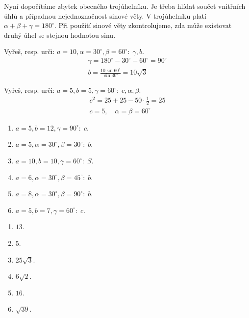 \documentclass[11pt,a4paper]{article}
\begin{document}
Nyní dopočítáme zbytek obecného trojúhelníku. Je třeba hlídat součet vnitřních úhlů a případnou nejednoznačnost sinové věty.
V trojúhelníku platí $\alpha+\beta+\gamma=180^\circ$. Při použití sinové věty zkontrolujeme, zda může existovat druhý úhel se stejnou hodnotou sinu.
\begin{prikladReseniBox}[title={Příklad 1}]
Vyřeš, resp. urči: $a=10,\alpha=30^\circ,\beta=60^\circ:\;\gamma,b$.
\tcblower
\[\begin{aligned}\gamma=180^\circ-30^\circ-60^\circ=90^\circ \\ b=\frac{10\sin60^\circ}{\sin30^\circ}=10\sqrt3\end{aligned}\]
\end{prikladReseniBox}
\begin{prikladReseniBox}[title={Příklad 2}]
Vyřeš, resp. urči: $a=5,b=5,\gamma=60^\circ:\;c,\alpha,\beta$.
\tcblower
\[\begin{aligned}c^2=25+25-50\cdot\frac{1}{2}=25 \\ c=5,\quad\alpha=\beta=60^\circ\end{aligned}\]
\end{prikladReseniBox}
\begin{zadaniReseniBox}[title={Samostatná práce 1}]
\begin{enumerate}[label=\alph*)]
\item $a=5,b=12,\gamma=90^\circ:\;c$.
\item $a=5,\alpha=30^\circ,\beta=30^\circ:\;b$.
\item $a=10,b=10,\gamma=60^\circ:\;S$.
\item $a=6,\alpha=30^\circ,\beta=45^\circ:\;b$.
\item $a=8,\alpha=30^\circ,\beta=90^\circ:\;b$.
\item $a=5,b=7,\gamma=60^\circ:\;c$.
\end{enumerate}
\tcblower
\begin{enumerate}[label=\alph*)]
\item $13$.
\item $5$.
\item $25\sqrt3$.
\item $6\sqrt2$.
\item $16$.
\item $\sqrt{39}$.
\end{enumerate}
\end{zadaniReseniBox}
\end{document}

